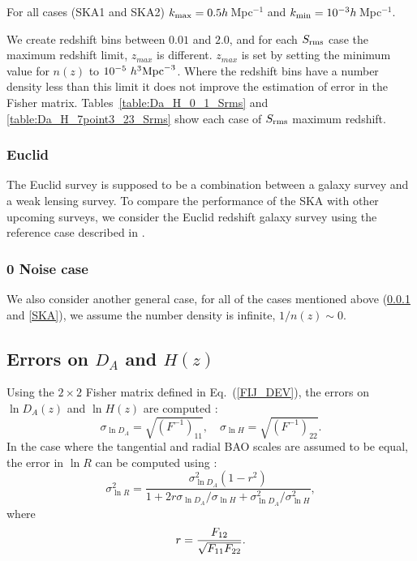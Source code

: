 \documentclass[useAMS,usenatbib]{mn2e}
\begin{document}
For all cases (SKA1 and SKA2) $k_{\rm max} = 0.5 h\,$Mpc$^{-1}$ and $k_{\rm min}  = 10^{-3}h\,$Mpc$^{-1}$. 

We create redshift bins between $0.01$ and $2.0$, and for each $S_{\rm rms}$ case the maximum redshift limit, $ z_{max}$ is different.  $z_{max}$ is  set by setting the minimum value for $n(z)$ to  $10^{-5} \ h^{3} {\rm Mpc}^{-3}$. Where the redshift bins have  a number density less than this limit it does not improve the estimation of error in the Fisher matrix. Tables~\ref{table:Da_H_0_1_Srms} and \ref{table:Da_H_7point3_23_Srms}  show each case of $S_{\rm rms}$  maximum redshift.

\subsubsection{Euclid}\label{Euclid}
The  Euclid survey is supposed to be a combination between a galaxy survey and a weak lensing survey. To compare the performance of the SKA with other upcoming surveys, we consider the Euclid redshift galaxy survey using the reference  case described in \cite{2013LRR....16....6A}.   

\subsubsection{ 0 Noise case}
We also consider another general case, for all of the cases mentioned above (\ref{Euclid} and \ref{SKA}),  we assume the number density is infinite, $1/n(z) \sim 0$.



\subsection{Errors on $D_A$ and $H(z)$}



Using  the $2\times2$ Fisher matrix defined in Eq.~(\ref{FIJ_DEV}), the errors on $\ln{D_A(z)}$ and $\ln{H(z)}$ are computed \citep{Seo:2007ns}:
\begin{equation}
\sigma_{\ln{D_A}}  = \sqrt{(F^{-1})_{11}}, \quad \sigma_{\ln{H}}  =  \sqrt{(F^{-1})_{22}} .
\end{equation}
In the case where the tangential and radial BAO scales are assumed to be equal, the error in  $\ln{R}$ can be computed using \citep{Seo:2007ns}:
\begin{equation}
 \sigma_{\ln R}^2
= \frac{\sigma_{\ln D_A}^2\left(1-r^2\right)}{1+2r\sigma_{\ln
D_A}/\sigma_{\ln H}+\sigma_{\ln D_A}^2/\sigma_{\ln H}^2},
\label{eq:sigmaR2}
\end{equation}
where 
\begin{equation}
r = {F_{12}\over \sqrt{F_{11} F_{22}}}.
\end{equation}
\end{document}

